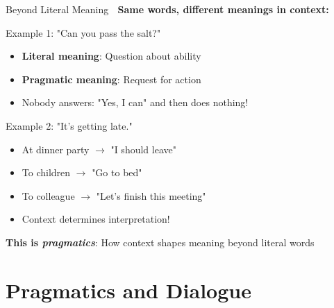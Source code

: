 \documentclass[aspectratio=169]{beamer}
\begin{document}
\begin{frame}[shrink=10]{Beyond Literal Meaning 🧩}
\small
    \textbf{Same words, different meanings in context:}

    \vspace{0.3cm}

    \begin{block}{Example 1: "Can you pass the salt?"}
        \begin{itemize}\setlength{\itemsep}{0pt}
            \item \textbf{Literal meaning}: Question about ability
            \item \textbf{Pragmatic meaning}: Request for action
            \item Nobody answers: "Yes, I can" and then does nothing!
        \end{itemize}
    \end{block}

    \vspace{0.3cm}

    \begin{block}{Example 2: "It's getting late."}
        \begin{itemize}\setlength{\itemsep}{0pt}
            \item At dinner party $\rightarrow$ "I should leave"
            \item To children $\rightarrow$ "Go to bed"
            \item To colleague $\rightarrow$ "Let's finish this meeting"
            \item Context determines interpretation!
        \end{itemize}
    \end{block}

    \vspace{0.3cm}

    \textbf{This is \textit{pragmatics}}: How context shapes meaning beyond literal words
\end{frame}

\section{Pragmatics and Dialogue}
\end{document}
